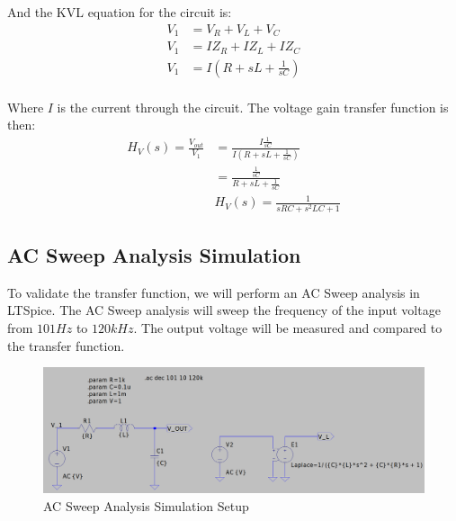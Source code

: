And the KVL equation for the circuit is:
\begin{align*}
    V_{1} &= V_{R} + V_{L} + V_{C} \\
    V_{1} &= IZ_{R} + IZ_{L} + IZ_{C} \\
    V_{1} &= I(R + sL + \frac{1}{sC}) \\
\end{align*}

Where $I$ is the current through the circuit. The voltage gain transfer function is then:
\begin{align*}
    H_{V}(s) = \frac{V_{out}}{V_{1}} &= \frac{I\frac{1}{sC}}{I(R + sL + \frac{1}{sC})} \\
    &= \frac{\frac{1}{sC}}{R + sL + \frac{1}{sC}} \\
    &\boxed{H_{V}(s) = \frac{1}{sRC + s^{2}LC + 1}}
\end{align*}

\subsection{AC Sweep Analysis Simulation}
To validate the transfer function, we will perform an AC Sweep analysis in LTSpice. The AC Sweep analysis will sweep the frequency of the input voltage from $101Hz$ to $120kHz$. The output voltage will be measured and compared to the transfer function.

\begin{figure}[h]
    \centering
    \includegraphics[width=1\textwidth, height=0.3\textheight]{assets/rlc-sim.png}
    \caption{AC Sweep Analysis Simulation Setup}
    \label{fig:ac_sweep}
\end{figure}


\newpage
\thispagestyle{plain}

